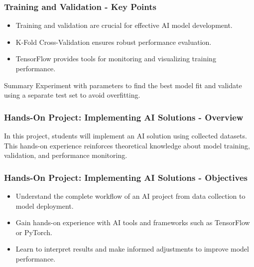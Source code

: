 \documentclass[aspectratio=169]{beamer}
\begin{document}
\begin{frame}[fragile]
    \frametitle{Training and Validation - Key Points}
    \begin{itemize}
        \item Training and validation are crucial for effective AI model development.
        \item K-Fold Cross-Validation ensures robust performance evaluation.
        \item TensorFlow provides tools for monitoring and visualizing training performance.
    \end{itemize}
    \begin{block}{Summary}
        Experiment with parameters to find the best model fit and validate using a separate test set to avoid overfitting.
    \end{block}
\end{frame}

\begin{frame}[fragile]
    \frametitle{Hands-On Project: Implementing AI Solutions - Overview}
    In this project, students will implement an AI solution using collected datasets. This hands-on experience reinforces theoretical knowledge about model training, validation, and performance monitoring.
\end{frame}

\begin{frame}[fragile]
    \frametitle{Hands-On Project: Implementing AI Solutions - Objectives}
    \begin{itemize}
        \item Understand the complete workflow of an AI project from data collection to model deployment.
        \item Gain hands-on experience with AI tools and frameworks such as TensorFlow or PyTorch.
        \item Learn to interpret results and make informed adjustments to improve model performance.
    \end{itemize}
\end{frame}
\end{document}
